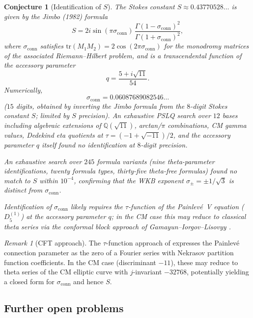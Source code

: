 \documentclass[11pt,a4paper]{article}
\newtheorem{conjecture}[theorem]{Conjecture}
\theoremstyle{definition}
\theoremstyle{remark}
\newtheorem{remark}[theorem]{Remark}
\begin{document}
\begin{conjecture}[Identification of $S$]
\label{conj:S_id}
The Stokes constant $S\approx
0.43770528\ldots$ is given by the
Jimbo (1982) \cite{Jimbo1982} formula
\[
  S = 2i\sin(\pi\sigma_{\mathrm{conn}})
  \,\frac{\Gamma(1-\sigma_{\mathrm{conn}})^2}
  {\Gamma(1+\sigma_{\mathrm{conn}})^2},
\]
where $\sigma_{\mathrm{conn}}$ satisfies
$\mathrm{tr}(M_1 M_2) =
2\cos(2\pi\sigma_{\mathrm{conn}})$
for the monodromy matrices of the
associated Riemann--Hilbert problem,
and is a transcendental function of the
accessory parameter
\[
  q = \frac{5+i\sqrt{11}}{54}.
\]
Numerically,
\[
  \sigma_{\mathrm{conn}} =
  0.06087689082546\ldots
\]
($15$ digits, obtained by inverting the
Jimbo formula from the $8$-digit Stokes
constant $S$; limited by $S$ precision).
An exhaustive PSLQ search over $12$
bases including algebraic extensions of
$\mathbb{Q}(\sqrt{11})$, arctan/$\pi$
combinations, CM gamma values, Dedekind
eta quotients at $\tau = (-1+\sqrt{-11})/2$,
and the accessory parameter $q$ itself
found no identification at $8$-digit
precision.

An exhaustive search over $245$ formula
variants (nine theta-parameter
identifications, twenty formula types,
thirty-five theta-free formulas) found
no match to $S$ within $10^{-4}$,
confirming that the WKB exponent
$\sigma_\pm = \pm 1/\sqrt{3}$ is
distinct from $\sigma_{\mathrm{conn}}$.

Identification of $\sigma_{\mathrm{conn}}$
likely requires the $\tau$-function of
the Painlev\'e~V equation ($D_5^{(1)}$) at the
accessory parameter $q$; in the CM case
this may reduce to classical theta
series via the conformal block approach
of Gamayun--Iorgov--Lisovyy
\cite{GIL2012}.
\end{conjecture}

\begin{remark}[CFT approach]
The $\tau$-function approach of
\cite{GIL2012} expresses the Painlev\'e
connection parameter as the zero of a
Fourier series with Nekrasov partition
function coefficients. In the CM case
(discriminant $-11$), these may reduce
to theta series of the CM elliptic curve
with $j$-invariant $-32768$,
potentially yielding a closed form for
$\sigma_{\mathrm{conn}}$ and hence $S$.
\end{remark}

\subsection{Further open problems}
\end{document}
